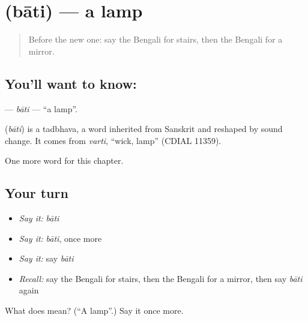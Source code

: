 \section[\texorpdfstring{\bn{বাতি} (bāti)}{বাতি (bāti)}]{ (bāti) — a lamp}

\label{lesson:BN-C61-bati}



\begin{quote}
Before the new one: say the Bengali for stairs, then the Bengali for a mirror.
\end{quote}

\subsection*{You'll want to know: }
\textbf{} — \emph{bāti} — \textquotedblleft{}a lamp\textquotedblright{}.

\begin{cousinweb}
\textbf{} (\emph{bāti}) is a tadbhava, a word inherited from Sanskrit and reshaped by sound change. It comes from \emph{varti}, \textquotedblleft{}wick, lamp\textquotedblright{} (CDIAL 11359).
\end{cousinweb}

\begin{grammarlens}[title={What you've built}]
One more word for this chapter.
\end{grammarlens}

\subsection*{Your turn}
\begin{itemize}
\raggedright
  \item \emph{Say it:} \emph{bāti}
  \item \emph{Say it:} \emph{bāti}, once more
  \item \emph{Say it:} say \emph{bāti}
  \item \emph{Recall:} say the Bengali for stairs, then the Bengali for a mirror, then say \emph{bāti} again
\end{itemize}

\begin{tcolorbox}[breakable,colback=teal!4,colframe=teal!35!black,title={Before you move on}]
What does  mean? (\textquotedblleft{}A lamp\textquotedblright{}.) Say it once more.
\end{tcolorbox}
